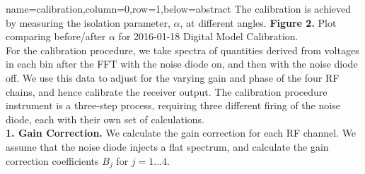 \documentclass[a0paper,portrait]{baposter}
\begin{document}
\begin{poster}
{}
{name=calibration,column=0,row=1,below=abstract}
{\small{The calibration is achieved by measuring the isolation parameter, $\alpha$, at different angles.}
\small{\textbf{Figure 2.} Plot comparing before/after $\alpha$ for 2016-01-18 Digital Model Calibration.\\
For the calibration procedure, we take spectra of quantities derived from voltages in each bin after the FFT with the noise diode on, and then with the noise diode off. We use this data to adjust for the varying gain and phase of the four RF chains, and hence calibrate the receiver output. The calibration procedure instrument is a three-step process, requiring three different firing of the noise diode, each with their own set of calculations.\\
\textbf{1. Gain Correction.} We calculate the gain correction for each RF channel. We assume that the noise diode injects a flat spectrum, and calculate the gain correction coefficients $B_{j}$ for $j=1...4$.}
}
\end{poster}
\end{document}
